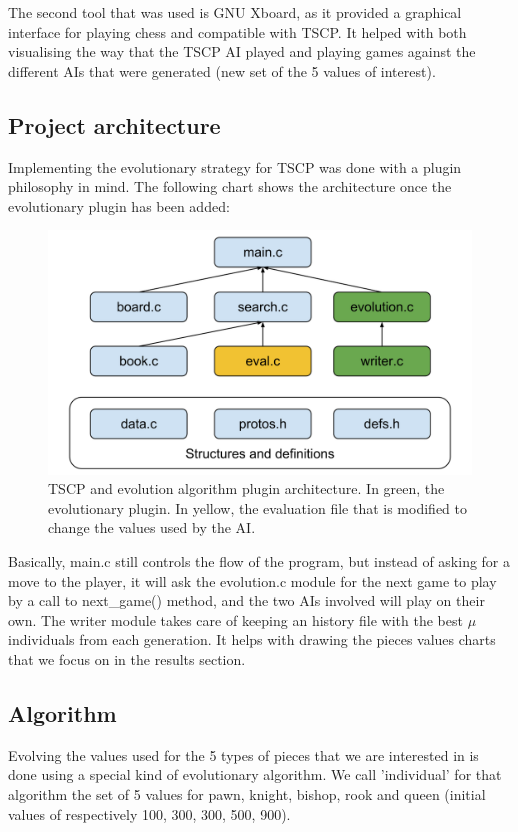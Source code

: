 \documentclass[12pt,a4paper,twocolumn]{article}
\begin{document}
The second tool that was used is GNU Xboard, as it provided a graphical interface for playing chess and compatible with TSCP. It helped with both visualising the way that the TSCP AI played and playing games against the different AIs that were generated (new set of the 5 values of interest).

\subsection{Project architecture}
Implementing the evolutionary strategy for TSCP was done with a plugin philosophy in mind. The following chart shows the architecture once the evolutionary plugin has been added:

\begin{center}
\begin{figure}
\includegraphics[scale=0.25]{images/Chess_AI_Architecture.png}
\caption{TSCP and evolution algorithm plugin architecture. In green, the evolutionary plugin. In yellow, the evaluation file that is modified to change the values used by the AI.}
\end{figure}
\end{center}

Basically, main.c still controls the flow of the program, but instead of asking for a move to the player, it will ask the evolution.c module for the next game to play by a call to next\_game() method, and the two AIs involved will play on their own. The writer module takes care of keeping an history file with the best $\mu$ individuals from each generation. It helps with drawing the pieces values charts that we focus on in the results section.

\subsection{Algorithm}
Evolving the values used for the 5 types of pieces that we are interested in is done using a special kind of evolutionary algorithm. We call 'individual' for that algorithm the set of 5 values for pawn, knight, bishop, rook and queen (initial values of respectively 100, 300, 300, 500, 900).
\end{document}
